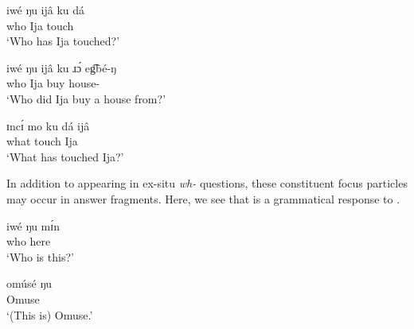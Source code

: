 \documentclass[output=paper,colorlinks,citecolor=brown
]{langscibook}
\begin{document}
\ea \label{ex:matte:11}
\begin{xlist}

\ex \label{ex:matte:11a}
\gll iwé ŋu ijâ	ku dá {\longrule}\\
who \Foc{} Ija \Pfv{} touch\\
\glt `Who has Ija touched?'

\ex \label{ex:matte:11b}
\gll iwé ŋu	ijâ	ku ɹɔ́ eg͡bé-ŋ {\longrule}\\
who	\Foc{} Ija \Pfv{} buy house-\Def{}\\
\glt `Who did Ija buy a house from?'

\ex \label{ex:matte:11c}
\gll ɪncɪ́ mo {\longrule} ku dá ijâ\\
what \Foc{} {} \Pfv{} touch Ija\\
\glt `What has touched Ija?'

\end{xlist}
\z

\noindent In addition to appearing in ex-situ \textit{wh-} questions, these constituent focus particles may occur in answer fragments. Here, we see that  is a grammatical response to .


\ea \label{ex:matte:12}
\begin{xlist}

\ex \label{ex:matte:12a}
\gll iwé ŋu mɪ́n\\
who \Foc{} here\\
\glt `Who is this?'

\ex \label{ex:matte:12b}
\gll omúsé ŋu\\ 
Omuse \Foc{}\\
\glt `(This is) Omuse.'

\end{xlist}
\z
\end{document}
